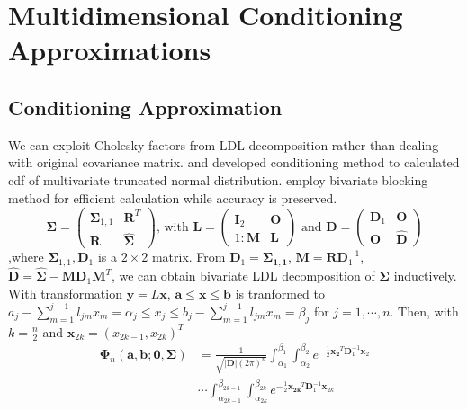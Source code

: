 \section{Multidimensional Conditioning Approximations}

\subsection{Conditioning Approximation}

We can exploit Cholesky factors from LDL decomposition rather than dealing with original covariance matrix. \citet{mendell1974multifactorial} and \citet{kamakura1989estimation} developed conditioning method to calculated cdf of multivariate truncated normal distribution. \citet{trinh2015bivariate} employ bivariate blocking method for efficient calculation while accuracy is preserved.\\
$$\mathbf{\Sigma} = \begin{pmatrix}
\mathbf{\Sigma}_{1,1} & \mathbf{R}^T\\
\mathbf{R} & \mathbf{\hat{\Sigma}}
\end{pmatrix}\text{, with } \mathbf{L}=\begin{pmatrix}
\mathbf{I}_{2} & \mathbf{O}\\1:
\mathbf{M} & \mathbf{L}
\end{pmatrix}\text{ and } \mathbf{D}=\begin{pmatrix}
\mathbf{D}_{1} & \mathbf{O}\\
\mathbf{O} & \mathbf{\hat{D}}
\end{pmatrix}$$
,where $\mathbf{\Sigma}_{1,1}, \mathbf{D}_{1}$ is a $2\times2$ matrix. From $\mathbf{D}_1=\mathbf{\Sigma_{1,1}}$, $\mathbf{M}=\mathbf{R}\mathbf{D}_1^{-1}$, $\mathbf{\hat{D}}=\mathbf{\hat{\Sigma}}-\mathbf{M}\mathbf{D}_1\mathbf{M}^T$, we can obtain bivariate LDL decomposition of $\mathbf{\Sigma}$ inductively.\\
With transformation $\mathbf{y}=L\mathbf{x}$, $\mathbf{a}\leq\mathbf{x}\leq\mathbf{b}$ is tranformed to $a_j-\sum_{m=1}^{j-1}l_{jm}x_m=\alpha_j\leq x_j\leq b_j-\sum_{m=1}^{j-1}l_{jm}x_m=\beta_j$ for $j=1,\cdots,n$. Then, with $k=\frac{n}{2}$ and $\mathbf{x}_{2k}=(x_{2k-1},x_{2k})^T$
\begin{align}\label{eqn:phi_cond-biv}
	\boldsymbol{\Phi}_n(\mathbf{a},\mathbf{b};\mathbf{0},\mathbf{\Sigma})
	&= \frac{1}{\sqrt{\lvert\mathbf{D}\rvert(2\pi)^n}}\int_{\alpha_1}^{\beta_1}\int_{\alpha_2}^{\beta_2}e^{-\frac{1}{2}\mathbf{x_2}^T\mathbf{D}_1^{-1}\mathbf{x}_2}\nonumber\\
	&\cdots \int_{\alpha_{2k-1}}^{\beta_{2k-1}}\int_{\alpha_{2k}}^{\beta_{2k}}e^{-\frac{1}{2}\mathbf{x_{2k}}^T\mathbf{D}_1^{-1}\mathbf{x}_{2k}}
\end{align}
